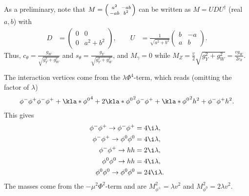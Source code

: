 \documentclass[english, parskip=full]{scrbook}
\newcommand{\example}[3]{\begin{tcolorbox}[colback=colorbackgroundexample,colframe=colorexample, breakable,enhanced,title={\textbf{#1}: #2.}]#3\end{tcolorbox}}
\begin{document}
{\begin{align}
\end{align}
As a preliminary, note that $M=\begin{psmallmatrix} a^2 & -ab \\ -ab & b^2 \end{psmallmatrix}$ can be written as $M=UDU^\dagger$ (real $a,b$) with
\begin{align}
D &= \begin{pmatrix}
0 & 0 \\ 0 & a^2+b^2
\end{pmatrix}, \qquad U &= \frac{1}{\sqrt{a^2+b^2}} \begin{pmatrix}
b & -a \\ a & b
\end{pmatrix}.
\end{align}
Thus, $c_\theta = \frac{g_W}{\sqrt{g_Y^2+g_W^2}}$ and $s_\theta = \frac{g_Y}{\sqrt{g_Y^2+g_W^2}}$, and $M_\gamma=0$ while $M_Z = \frac{v}{2}\sqrt{g_Y^2+g_W^2} = \frac{vg_W}{2c_\theta}$.
}
\example{Gauge Bosons}{Interaction vertices}{
The interaction vertices come from the $\lambda\Phi^4$-term, which reads (omitting the factor of $\lambda$)
\begin{align}
\phi^-\phi^+\phi^-\phi^+ + \kla*{\phi^0}^4 + 2\kla*{\phi^0}^2 \phi^-\phi^+ + \kla*{\phi^0}^2h^2 + \phi^-\phi^+ h^2.
\end{align}
This gives
\begin{align}
\phi^-\phi^+ \rightarrow \phi^-\phi^+ &= 4\i\lambda,\\
\phi^-\phi^+ \rightarrow \phi^0\phi^0 &= 4\i\lambda,\\
\phi^-\phi^+ \rightarrow hh &= 2\i\lambda,\\
\phi^0\phi^0 \rightarrow hh &= 4\i\lambda,\\
\phi^0\phi^0 \rightarrow \phi^0\phi^0 &= 24\i\lambda.
\end{align}
The masses come from the $-\mu^2\Phi^2$-term and are $M_{\phi^\pm}^2 = \lambda v^2$ and $M_{\phi^0}^2 = 2\lambda v^2$.
}
\end{document}
